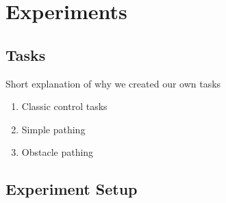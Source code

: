 \section{Experiments}

\subsection{Tasks}
Short explanation of why we created our own tasks
\begin{enumerate}
	\item Classic control tasks
	\item Simple pathing
	\item Obstacle pathing
\end{enumerate}

\subsection{Experiment Setup}